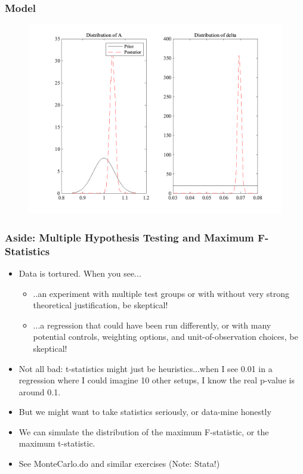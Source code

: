 \documentclass{beamer}
\begin{document}
\begin{frame}
\frametitle[alignment=center]{Model}
\begin{figure}
\centering
\includegraphics[scale=0.3]{MCMC_Example_VFI.png}
\end{figure}
\end{frame}


\begin{frame}
\frametitle[alignment=center]{Aside:  Multiple Hypothesis Testing and Maximum F-Statistics}
\begin{itemize}
\item Data is tortured.  When you see...
\bigskip
\begin{itemize}
\item ..an experiment with multiple test groups or with without very strong theoretical justification, be skeptical!
\smallskip
\item ...a regression that could have been run differently, or with many potential controls, weighting options, and unit-of-observation choices, be skeptical!
\smallskip
\end{itemize}
\item Not all bad: t-statistics might just be heuristics...when I see 0.01 in a regression where I could imagine 10 other setups, I know the real p-value is around 0.1.
\bigskip
\item But we might want to take statistics seriously, or data-mine honestly
\bigskip
\item We can simulate the distribution of the maximum F-statistic, or the maximum t-statistic.
\bigskip
\item See MonteCarlo.do and similar exercises (Note: Stata!)
\end{itemize}
\end{frame}
\end{document}
